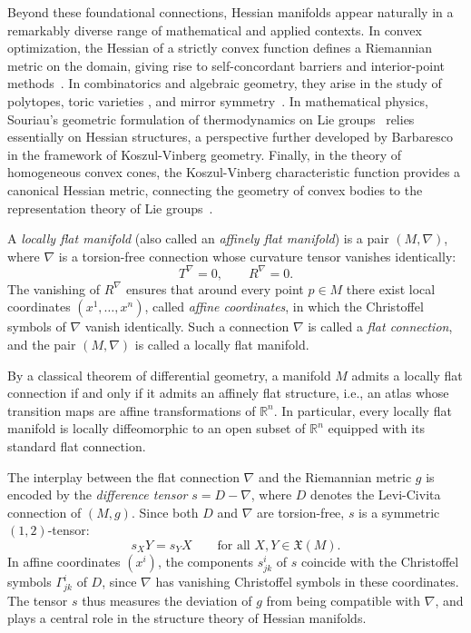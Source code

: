 Beyond these foundational connections, Hessian manifolds appear naturally in a 
remarkably diverse range of mathematical and applied contexts. In convex 
optimization, the Hessian of a strictly convex function defines a Riemannian 
metric on the domain, giving rise to self-concordant barriers and interior-point 
methods~\citep{nesterov1994, PuechmorelTo2023}. In combinatorics and algebraic geometry, 
they arise in the study of polytopes, toric varieties \citep{Fujita2024}, and mirror 
symmetry~\citep{zhang2020}. In mathematical physics, Souriau's geometric 
formulation of thermodynamics on Lie groups~\citep{souriau1997} relies essentially 
on Hessian structures, a perspective further developed by 
Barbaresco~\citep{barbaresco2015} in the framework of Koszul-Vinberg 
geometry. Finally, in the theory of homogeneous convex cones, the Koszul-Vinberg 
characteristic function provides a canonical Hessian metric, connecting the 
geometry of convex bodies to the representation theory of Lie 
groups~\citep{vinberg1963}.

\begin{defn}
A \emph{locally flat manifold} (also called an \emph{affinely flat manifold}) is a 
pair $(M, \nabla)$, where $\nabla$ is a torsion-free connection whose curvature 
tensor vanishes identically:
\[
  T^\nabla = 0, \qquad R^\nabla = 0.
\]
The vanishing of $R^\nabla$ ensures that around every point $p \in M$ there exist 
local coordinates $(x^1, \dots, x^n)$, called \emph{affine coordinates}, in which 
the Christoffel symbols of $\nabla$ vanish identically. Such a connection $\nabla$ 
is called a \emph{flat connection}, and the pair $(M, \nabla)$ is called a locally 
flat manifold.
\end{defn}

\begin{rem}
By a classical theorem of differential geometry, a manifold $M$ admits a locally 
flat connection if and only if it admits an affinely flat structure, i.e., an atlas 
whose transition maps are affine transformations of $\mathbb{R}^n$. In particular, 
every locally flat manifold is locally diffeomorphic to an open subset of 
$\mathbb{R}^n$ equipped with its standard flat connection.
\end{rem}

The interplay between the flat connection $\nabla$ and the Riemannian metric $g$ 
is encoded by the \emph{difference tensor} $s = D - \nabla$, where $D$ denotes 
the Levi-Civita connection of $(M, g)$. Since both $D$ and $\nabla$ are 
torsion-free, $s$ is a symmetric $(1,2)$-tensor:
\[
  s_X Y = s_Y X \qquad \text{for all } X, Y \in \mathfrak{X}(M).
\]
In affine coordinates $(x^i)$, the components $s^i_{jk}$ of $s$ coincide with the 
Christoffel symbols $\Gamma^i_{jk}$ of $D$, since $\nabla$ has vanishing 
Christoffel symbols in these coordinates. The tensor $s$ thus measures the 
deviation of $g$ from being compatible with $\nabla$, and plays a central role in 
the structure theory of Hessian manifolds.

